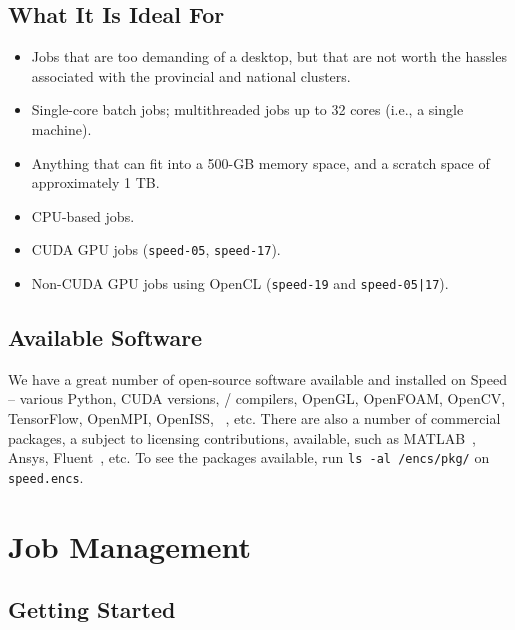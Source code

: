 \documentclass{easychair}
\begin{document}
\subsection{What It Is Ideal For}

\begin{itemize}
\item
Jobs that are too demanding of a desktop, but that are not worth the hassles associated with the provincial and national clusters. 
\item
Single-core batch jobs; multithreaded jobs up to 32 cores (i.e., a single machine).
\item
Anything that can fit into a 500-GB memory space, and a scratch space of approximately 1 TB. 
\item
CPU-based jobs. 
\item
CUDA GPU jobs (\texttt{speed-05}, \texttt{speed-17}).
\item
Non-CUDA GPU jobs using OpenCL (\texttt{speed-19} and \texttt{speed-05|17}).
\end{itemize}

\subsection{Available Software}

We have a great number of open-source software available and installed
on Speed -- various Python, CUDA versions, {\cpp}/{\java} compilers, OpenGL,
OpenFOAM, OpenCV, TensorFlow, OpenMPI, OpenISS, {\marf}~\cite{marf}, etc.
There are also a number of commercial packages, a subject to licensing
contributions, available, such as MATLAB~\cite{matlab,scholarpedia-matlab}, Ansys, Fluent~\cite{fluent}, etc. To see the
packages available, run \texttt{ls -al /encs/pkg/} on \texttt{speed.encs}.

\section{Job Management}
\label{sect:job-management}

\subsection{Getting Started}
\end{document}
